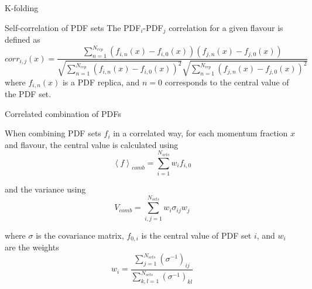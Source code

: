 \begin{frame}{K-folding}
\begin{figure}[t]
\end{figure}
\end{frame}



\begin{frame}[t]{Self-correlation of PDF sets}
The PDF$_i$-PDF$_j$ correlation for a given flavour is defined as
$$corr_{i,j}(x)= \frac{\sum_{n=1}^{N_{rep}} (f_{i,n}(x) -  f_{i,0}(x) )(f_{j,n}(x) -  f_{j,0}(x)) }{\sqrt{\sum_{n=1}^{N_{rep}}(f_{i,n}(x) - f_{i,0}(x))^2} \sqrt{\sum_{n=1}^{N_{rep}}(f_{j,n}(x) -  f_{j,0}(x))^2}}$$
where $f_{i,n}(x)$ is a PDF replica, and $n=0$ corresponds to the central value of the PDF set. 

\end{frame}

\begin{frame}[t]{Correlated combination of PDFs}

When combining PDF sets $f_i$ in a correlated way, for each momentum fraction $x$ and flavour, the central value is calculated using
$$
\left\langle f\right\rangle_{comb}=\sum_{i=1}^{N_{sets}} w_{i} f_{i,0}
$$

and the variance using
$$
V_{comb}=\sum_{i, j=1}^{N_{sets}} w_{i} \sigma_{i j} w_{j}
$$

where $\sigma$ is the covariance matrix, $f_{0,i}$ is the central value of PDF set $i$, and $w_i$ are the weights 
$$
w_{i}=\frac{\sum_{j=1}^{N_{sets}}\left(\sigma^{-1}\right)_{i j}}{\sum_{k, l=1}^{N_{sets}}\left(\sigma^{-1}\right)_{k l}}
$$

\end{frame}
